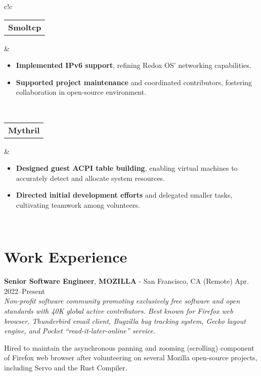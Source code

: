 \documentclass[a4paper,skipsamekey,11pt,english]{curve}
\newcommand{\makeWorkHistoryTitle}[5]{
  \begin{tcolorbox}[colback=base1!10,colframe=base1!10,frame hidden]
    {\color{blue}\textbf{#1}}, \textbf{#2} - #3 \hfill #4\\
    {\small\textit{#5}}
  \end{tcolorbox}
}
\begin{document}
\begin{center}
{\begin{tabular}{c!{\color{blue}\vrule}c}
      \hline
      {
       \begin{tabular}{c}
         \color{base03}\textbf{Smoltcp}
       \end{tabular}
      } & {
        \begin{minipage}{5in}
          \vspace{5pt}
          \begin{itemize}
            \item \textbf{Implemented IPv6 support}, refining Redox OS’
            networking capabilities.
            \item \textbf{Supported project maintenance} and coordinated
            contributors, fostering collaboration in open-source environment.
          \end{itemize}
        \end{minipage}
        \vspace{1pt}
      }
      \\
      \hline
      {
       \begin{tabular}{c}
         \color{base03}\textbf{Mythril}
       \end{tabular}
      } & {
        \begin{minipage}{5in}
          \vspace{5pt}
          \begin{itemize}
            \item \textbf{Designed guest ACPI table building}, enabling virtual
            machines to accurately detect and allocate system resources.
            \item \textbf{Directed initial development efforts} and delegated
            smaller tasks, cultivating teamwork among volunteers.
          \end{itemize}
        \end{minipage}
        \vspace{1pt}
      }
      \\
    \end{tabular}}
  \end{center}

  \section{Work Experience}
  \makeWorkHistoryTitle
    {Senior Software Engineer}
    {MOZILLA}
    {San Francisco, CA (Remote)}
    {Apr. 2022–Present}
    {
      Non-profit software community promoting exclusively free software and open
      standards with 40K global active contributors. Best known for Firefox web
      browser, Thunderbird email client, Bugzilla bug tracking system, Gecko
      layout engine, and Pocket “read-it-later-online” service.
    }
  Hired to maintain the asynchronous panning and zooming (scrolling)
  component of Firefox web browser after volunteering on several Mozilla
  open-source projects, including Servo and the Rust Compiler.
\end{document}
